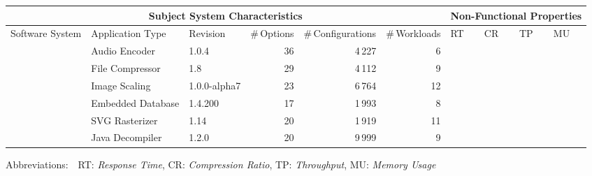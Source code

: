\begin{tabularx}{\textwidth}{lllrrr|XXXX}
		\toprule
		\multicolumn{6}{c}{\textbf{Subject System Characteristics}} & \multicolumn{4}{c}{\textbf{Non-Functional Properties}} \\
		\midrule
		Software System &  Application Type & Revision & \#\,Options & \#\,Configurations & \#\,Workloads & RT & CR & TP & MU \\
		\midrule
		\jumper & Audio Encoder & 1.0.4 & 36 & 4\,227 & 6 & \checkmark & \checkmark &  & \checkmark  \\
		
		\kanzi & File Compressor & 1.8 & 29 & 4\,112 & 9 & \checkmark & \checkmark &  & \checkmark  \\
			
		\dconvert & Image Scaling & 1.0.0-alpha7 & 23 & 6\,764 & 12 & \checkmark  &  &  & \checkmark  \\
				
		\htwo & Embedded Database & 1.4.200 & 17 & 1\,993  & 8 &   &  & \checkmark &  \\
		
		\batik & SVG Rasterizer & 1.14 & 20 & 1\,919 &  11 & \checkmark &   &  & \checkmark  \\
		
		\jadx & Java Decompiler & 1.2.0 & 20 & 9\,999 & 9 & \checkmark &  &  & \checkmark  \\
			
		

		
		
		
		
		\bottomrule
	\end{tabularx}
	
	{\vspace{2mm}
	{\footnotesize Abbreviations:$\quad$RT: \textit{Response Time}, CR: \textit{Compression Ratio}, TP: \textit{Throughput}, MU: \textit{Memory Usage}}}
	\vspace{0.1cm}
